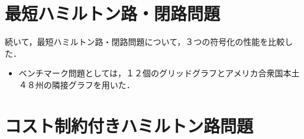 \section{最短ハミルトン路・閉路問題}
続いて，最短ハミルトン路・閉路問題について，３つの符号化の性能を比較した．

\begin{itemize}
\item ベンチマーク問題としては，１２個のグリッドグラフとアメリカ合衆国本土４８州の隣接グラフを用いた．
\end{itemize}

\section{コスト制約付きハミルトン路問題}



